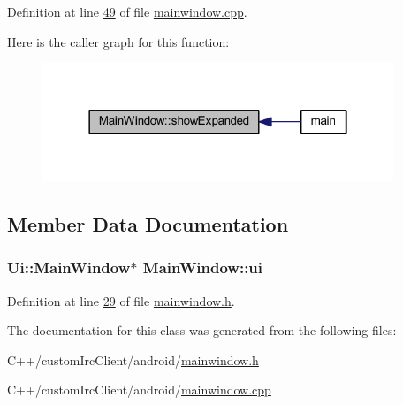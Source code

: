Definition at line \hyperlink{android_2mainwindow_8cpp_source_l00049}{49} of file \hyperlink{android_2mainwindow_8cpp_source}{mainwindow.\-cpp}.



Here is the caller graph for this function\-:
\nopagebreak
\begin{figure}[H]
\begin{center}
\leavevmode
\includegraphics[width=298pt]{d9/dc6/class_main_window_ae66038a9d909fd409d781bf7c3f3ff2c_icgraph}
\end{center}
\end{figure}




\subsection{Member Data Documentation}
\hypertarget{class_main_window_a35466a70ed47252a0191168126a352a5}{
\subsubsection[{ui}]{\setlength{\rightskip}{0pt plus 5cm}Ui\-::\-Main\-Window$\ast$ Main\-Window\-::ui\hspace{0.3cm}{\ttfamily [private]}}}\label{d9/dc6/class_main_window_a35466a70ed47252a0191168126a352a5}


Definition at line \hyperlink{android_2mainwindow_8h_source_l00029}{29} of file \hyperlink{android_2mainwindow_8h_source}{mainwindow.\-h}.



The documentation for this class was generated from the following files\-:\begin{DoxyCompactItemize}
\item 
C++/custom\-Irc\-Client/android/\hyperlink{android_2mainwindow_8h}{mainwindow.\-h}\item 
C++/custom\-Irc\-Client/android/\hyperlink{android_2mainwindow_8cpp}{mainwindow.\-cpp}\end{DoxyCompactItemize}
